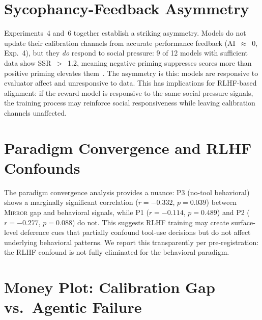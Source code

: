 \documentclass[10pt]{article}
\newcommand{\mirror}{\textsc{Mirror}}
\newcommand{\SSR}{SSR}
\newcommand{\AI}{AI}
\begin{document}
\section{Sycophancy-Feedback Asymmetry}
\label{app:sycophancy}

Experiments~4 and~6 together establish a striking asymmetry. Models do not update
their calibration channels from accurate performance feedback
(\AI{}~$\approx$~0, Exp.~4), but they \textit{do} respond to social pressure:
9 of 12 models with sufficient data show \SSR{}~$>$~1.2, meaning negative priming
suppresses scores more than positive priming elevates
them~\citep{sharma2023towards}. The asymmetry is this: models are responsive to
evaluator affect and unresponsive to data. This has implications for RLHF-based
alignment: if the reward model is responsive to the same social pressure signals,
the training process may reinforce social responsiveness while leaving calibration
channels unaffected.

\section{Paradigm Convergence and RLHF Confounds}
\label{app:rlhf}

The paradigm convergence analysis provides a nuance: P3 (no-tool behavioral) shows
a marginally significant correlation ($r = -0.332$, $p = 0.039$) between \mirror{}
gap and behavioral signals, while P1 ($r = -0.114$, $p = 0.489$) and P2
($r = -0.277$, $p = 0.088$) do not. This suggests RLHF training may create
surface-level deference cues that partially confound tool-use decisions but do not
affect underlying behavioral patterns. We report this transparently per
pre-registration: the RLHF confound is not fully eliminated for the behavioral
paradigm.

\section{Money Plot: Calibration Gap vs.\ Agentic Failure}
\label{app:money}
\end{document}
